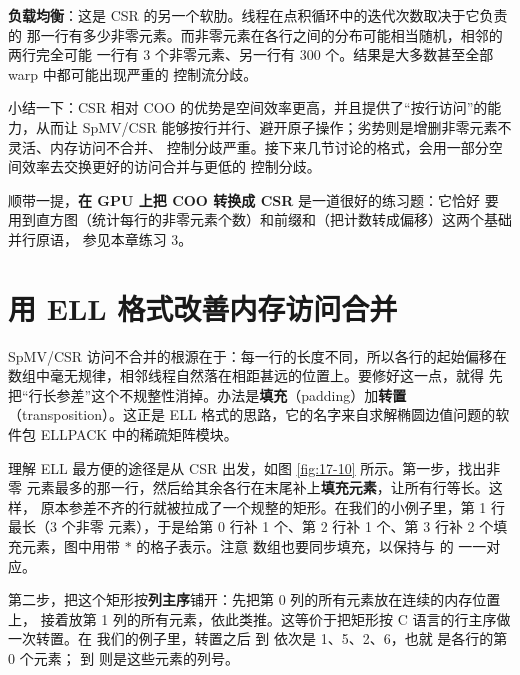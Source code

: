 \textbf{负载均衡}：这是 CSR 的另一个软肋。线程在点积循环中的迭代次数取决于它负责的
那一行有多少非零元素。而非零元素在各行之间的分布可能相当随机，相邻的两行完全可能
一行有 3 个非零元素、另一行有 300 个。结果是大多数甚至全部 warp 中都可能出现严重的
控制流分歧。

小结一下：CSR 相对 COO 的优势是空间效率更高，并且提供了“按行访问”的能力，从而让
SpMV/CSR 能够按行并行、避开原子操作；劣势则是增删非零元素不灵活、内存访问不合并、
控制分歧严重。接下来几节讨论的格式，会用一部分空间效率去交换更好的访问合并与更低的
控制分歧。

\noindent 顺带一提，\textbf{在 GPU 上把 COO 转换成 CSR} 是一道很好的练习题：它恰好
要用到直方图（统计每行的非零元素个数）和前缀和（把计数转成偏移）这两个基础并行原语，
参见本章练习 3。

\section{用 ELL 格式改善内存访问合并}
\label{sec:spmv-ell}

SpMV/CSR 访问不合并的根源在于：每一行的长度不同，所以各行的起始偏移在
 数组中毫无规律，相邻线程自然落在相距甚远的位置上。要修好这一点，就得
先把“行长参差”这个不规整性消掉。办法是\textbf{填充}（padding）加\textbf{转置}
（transposition）。这正是 ELL 格式的思路，它的名字来自求解椭圆边值问题的软件包
ELLPACK 中的稀疏矩阵模块\cite{rice2012ellpack}。

理解 ELL 最方便的途径是从 CSR 出发，如图 \ref{fig:17-10} 所示。第一步，找出非零
元素最多的那一行，然后给其余各行在末尾补上\textbf{填充元素}，让所有行等长。这样，
原本参差不齐的行就被拉成了一个规整的矩形。在我们的小例子里，第 1 行最长（3 个非零
元素），于是给第 0 行补 1 个、第 2 行补 1 个、第 3 行补 2 个填充元素，图中用带
$*$ 的格子表示。注意  数组也要同步填充，以保持与  的
一一对应。

第二步，把这个矩形按\textbf{列主序}铺开：先把第 0 列的所有元素放在连续的内存位置上，
接着放第 1 列的所有元素，依此类推。这等价于把矩形按 C 语言的行主序做一次转置。在
我们的例子里，转置之后  到  依次是 1、5、2、6，也就
是各行的第 0 个元素； 到  则是这些元素的列号。

